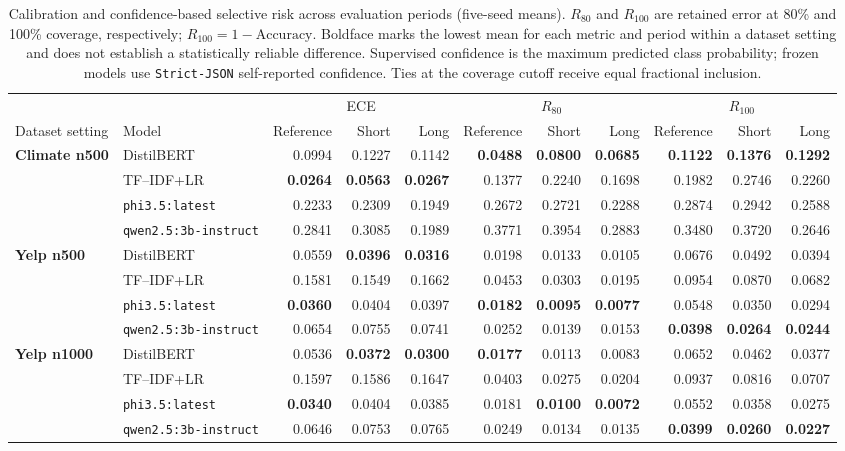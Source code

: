 \begin{table}[t]
\centering\footnotesize
\caption{Calibration and confidence-based selective risk across evaluation periods (five-seed means). $R_{80}$ and $R_{100}$ are retained error at 80\% and 100\% coverage, respectively; $R_{100}=1-\mathrm{Accuracy}$. Boldface marks the lowest mean for each metric and period within a dataset setting and does not establish a statistically reliable difference. Supervised confidence is the maximum predicted class probability; frozen models use \texttt{Strict-JSON} self-reported confidence. Ties at the coverage cutoff receive equal fractional inclusion.}
\label{tab:temporal-reliability}
\setlength{\tabcolsep}{3.2pt}
\begin{tabular}{llrrrrrrrrr}
\toprule
& & \multicolumn{3}{c}{ECE} & \multicolumn{3}{c}{$R_{80}$} & \multicolumn{3}{c}{$R_{100}$} \\
\cmidrule(lr){3-5}\cmidrule(lr){6-8}\cmidrule(lr){9-11}
Dataset setting & Model & Reference & Short & Long & Reference & Short & Long & Reference & Short & Long \\
\midrule
\textbf{Climate n500} & DistilBERT & 0.0994 & 0.1227 & 0.1142 & \textbf{0.0488} & \textbf{0.0800} & \textbf{0.0685} & \textbf{0.1122} & \textbf{0.1376} & \textbf{0.1292} \\
 & TF--IDF+LR & \textbf{0.0264} & \textbf{0.0563} & \textbf{0.0267} & 0.1377 & 0.2240 & 0.1698 & 0.1982 & 0.2746 & 0.2260 \\
 & \texttt{phi3.5:latest} & 0.2233 & 0.2309 & 0.1949 & 0.2672 & 0.2721 & 0.2288 & 0.2874 & 0.2942 & 0.2588 \\
 & \texttt{qwen2.5:3b-instruct} & 0.2841 & 0.3085 & 0.1989 & 0.3771 & 0.3954 & 0.2883 & 0.3480 & 0.3720 & 0.2646 \\
\midrule
\textbf{Yelp n500} & DistilBERT & 0.0559 & \textbf{0.0396} & \textbf{0.0316} & 0.0198 & 0.0133 & 0.0105 & 0.0676 & 0.0492 & 0.0394 \\
 & TF--IDF+LR & 0.1581 & 0.1549 & 0.1662 & 0.0453 & 0.0303 & 0.0195 & 0.0954 & 0.0870 & 0.0682 \\
 & \texttt{phi3.5:latest} & \textbf{0.0360} & 0.0404 & 0.0397 & \textbf{0.0182} & \textbf{0.0095} & \textbf{0.0077} & 0.0548 & 0.0350 & 0.0294 \\
 & \texttt{qwen2.5:3b-instruct} & 0.0654 & 0.0755 & 0.0741 & 0.0252 & 0.0139 & 0.0153 & \textbf{0.0398} & \textbf{0.0264} & \textbf{0.0244} \\
\midrule
\textbf{Yelp n1000} & DistilBERT & 0.0536 & \textbf{0.0372} & \textbf{0.0300} & \textbf{0.0177} & 0.0113 & 0.0083 & 0.0652 & 0.0462 & 0.0377 \\
 & TF--IDF+LR & 0.1597 & 0.1586 & 0.1647 & 0.0403 & 0.0275 & 0.0204 & 0.0937 & 0.0816 & 0.0707 \\
 & \texttt{phi3.5:latest} & \textbf{0.0340} & 0.0404 & 0.0385 & 0.0181 & \textbf{0.0100} & \textbf{0.0072} & 0.0552 & 0.0358 & 0.0275 \\
 & \texttt{qwen2.5:3b-instruct} & 0.0646 & 0.0753 & 0.0765 & 0.0249 & 0.0134 & 0.0135 & \textbf{0.0399} & \textbf{0.0260} & \textbf{0.0227} \\
\bottomrule
\end{tabular}
\end{table}
